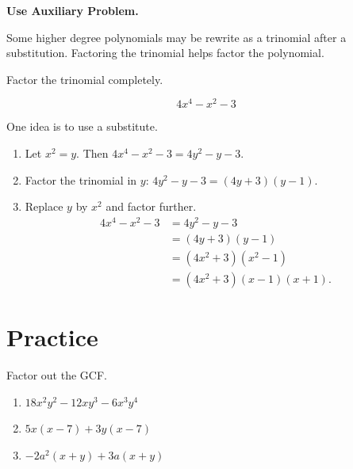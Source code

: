 \documentclass[en,11pt]{elegantbook}
\newcommand{\size}[2]{{\fontsize{#1}{0}\selectfont#2}}
\newenvironment{rmdtip}{
	\vspace*{0.5\baselineskip}
	\par\noindent
	\makebox[-3pt][r]{\color{red!90}\size{12}{\HandRight}\,\,}
    \begin{tcolorbox}[
    enhanced,
    title={\textbf{\color{second}Tips}},
    title style={left color=blue!10!green!20!white,right color=yellow!20!blue!20!white},
    colback=cyan!10!white,
    ]
    \sffamily
}{
    \end{tcolorbox}
    \par\ignorespacesafterend
}
\let\BeginKnitrBlock\begin \let\EndKnitrBlock\end
\begin{document}
\begin{rmdtip}

\textbf{Use Auxiliary Problem.}

Some higher degree polynomials may be rewrite as a trinomial after a substitution. Factoring the trinomial helps factor the polynomial.

\end{rmdtip}

\BeginKnitrBlock{example}
\protect\hypertarget{exm:unnamed-chunk-22}{}{\label{exm:unnamed-chunk-22} }
Factor the trinomial completely.

\[4x^4-x^2-3\]
\EndKnitrBlock{example}

\BeginKnitrBlock{solution}
{}
One idea is to use a substitute.

\begin{enumerate}
\def\labelenumi{\arabic{enumi}.}

\item
  Let \(x^2=y\). Then \(4x^4-x^2-3=4y^2-y-3\).
\item
  Factor the trinomial in \(y\): \(4y^2-y-3=(4y+3)(y-1)\).
\item
  Replace \(y\) by \(x^2\) and factor further.
  \[
   \begin{split}
       4x^4-x^2-3&=4y^2-y-3\\
       &=(4y+3)(y-1)\\
       &=(4x^2+3)(x^2-1)\\
       &=(4x^2+3)(x-1)(x+1).
   \end{split}
  \]
\end{enumerate}
\EndKnitrBlock{solution}

\newpage

\hypertarget{practice-1}{%
\section{Practice}\label{practice-1}}

\BeginKnitrBlock{exercise}
\protect\hypertarget{exr:unnamed-chunk-24}{}{\label{exr:unnamed-chunk-24} }
Factor out the GCF.

\begin{enumerate}
\def\labelenumi{\arabic{enumi}.}

\item
  \(18x^2y^2-12xy^3-6x^3y^4\)
\item
  \(5x(x-7)+3y(x-7)\)
\item
  \(-2a^2(x+y)+3a(x+y)\)
\end{enumerate}
\EndKnitrBlock{exercise}
\end{document}
